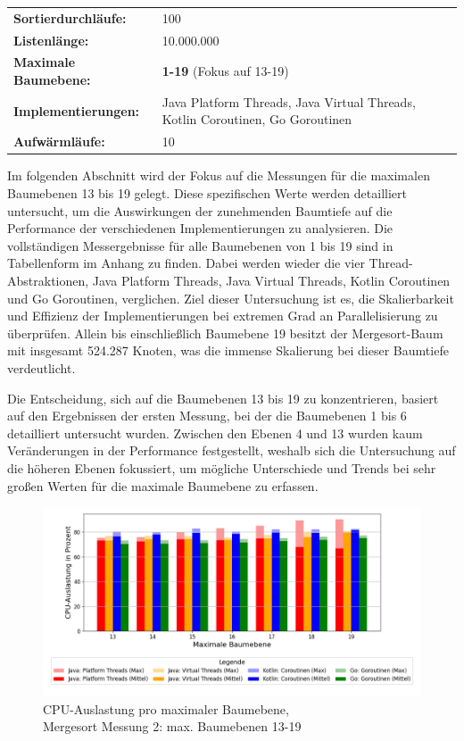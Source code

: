 \documentclass[fontsize=12pt,paper=a4,twoside=semi,parskip=half-,headsepline,headinclude]{scrreprt}
\begin{document}
\begin{tabularx}{\textwidth}{@{}lX@{}}
	\textbf{Sortierdurchläufe:} & 100 \\
	\textbf{Listenlänge:} & 10.000.000 \\
	\textbf{Maximale Baumebene:} & \textbf{1-19} (Fokus auf 13-19) \\
	\textbf{Implementierungen:} & Java Platform Threads, Java Virtual Threads, Kotlin Coroutinen, Go Goroutinen \\
	\textbf{Aufwärmläufe:} & 10
\end{tabularx}

Im folgenden Abschnitt wird der Fokus auf die Messungen für die maximalen Baumebenen 13 bis 19 gelegt. Diese spezifischen Werte werden detailliert untersucht, um die Auswirkungen der zunehmenden Baumtiefe auf die Performance der verschiedenen Implementierungen zu analysieren. Die vollständigen Messergebnisse für alle  Baumebenen von 1 bis 19 sind in Tabellenform im Anhang zu finden. Dabei werden wieder die vier Thread-Abstraktionen, Java Platform Threads, Java Virtual Threads, Kotlin Coroutinen und Go Goroutinen, verglichen. Ziel dieser Untersuchung ist es, die Skalierbarkeit und Effizienz der Implementierungen bei extremen Grad an Parallelisierung zu überprüfen. Allein bis einschließlich Baumebene 19 besitzt der Mergesort-Baum mit insgesamt 524.287 Knoten, was die immense Skalierung bei dieser Baumtiefe verdeutlicht.

Die Entscheidung, sich auf die Baumebenen 13 bis 19 zu konzentrieren, basiert auf den Ergebnissen der ersten Messung, bei der die Baumebenen 1 bis 6 detailliert untersucht wurden. Zwischen den Ebenen 4 und 13 wurden kaum Veränderungen in der Performance festgestellt, weshalb sich die Untersuchung auf die höheren Ebenen  fokussiert, um mögliche Unterschiede und Trends bei sehr großen Werten für die maximale Baumebene zu erfassen.

\begin{figure}[H]
	\centering
	\includegraphics[scale=0.5]{figures/mergesort/Maximalebauebenen1-19_pvcg/cpu_usage_bar_plot.png}
	\caption{CPU-Auslastung pro maximaler Baumebene,\\ Mergesort Messung 2: max. Baumebenen 13-19}
	\label{fig:ms1-19CPU}
\end{figure}
\end{document}
